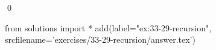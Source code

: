 
\begin{ex}
  \label{ex:33-29-recursion}
  
  \qed
\end{ex}
\begin{python0}
from solutions import *
add(label="ex:33-29-recursion",
    srcfilename='exercises/33-29-recursion/answer.tex')
\end{python0}
